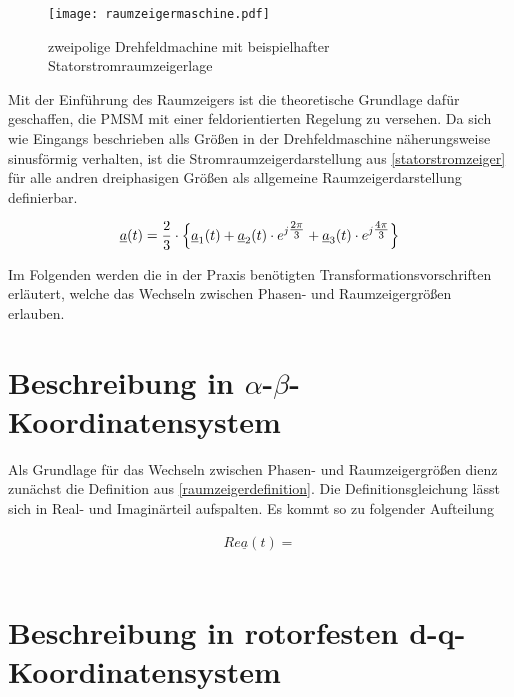 \begin{figure}[h]
	\centering
	\texttt{[image: raumzeigermaschine.pdf]}
	\label{fig:raumzeigermaschine}
	\caption{zweipolige Drehfeldmachine mit beispielhafter Statorstromraumzeigerlage}
\end{figure}

Mit der Einführung des Raumzeigers ist die theoretische Grundlage dafür geschaffen, die PMSM mit einer feldorientierten Regelung zu versehen. 
Da sich wie Eingangs beschrieben alls Größen in der Drehfeldmaschine näherungsweise sinusförmig verhalten, ist die Stromraumzeigerdarstellung aus \ref{statorstromzeiger} für alle andren dreiphasigen Größen als allgemeine Raumzeigerdarstellung definierbar.

\begin{align}
	\underline{a}(t) = \frac{2}{3} \cdot \Bigl\{\underline{a}_{1}(t) + \underline{a}_{2}(t)\cdot e^{j\tfrac{2\pi}{3}} + \underline{a}_{3}(t)\cdot e^{j\tfrac{4\pi}{3}} \Bigr\} \label{raumzeigerdefinition}
\end{align}

Im Folgenden werden die in der Praxis benötigten Transformationsvorschriften erläutert, welche das Wechseln zwischen Phasen- und Raumzeigergrößen erlauben.


\section{Beschreibung in $\alpha$-$\beta$-Koordinatensystem}\label{sec:clark}

Als Grundlage für das Wechseln zwischen Phasen- und Raumzeigergrößen dienz zunächst die Definition aus \ref{raumzeigerdefinition}. Die Definitionsgleichung lässt sich in Real- und Imaginärteil aufspalten. Es kommt so zu folgender Aufteilung

\begin{align}
	Re{\underline{a}(t)} =
	\label{realteil}
\end{align}

\begin{align}
	\label{imaginärteil}
\end{align}

\section{Beschreibung in rotorfesten d-q-Koordinatensystem}\label{sec:park}


